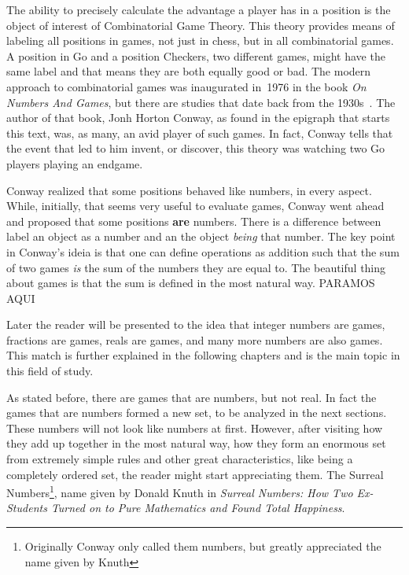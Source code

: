 The ability to precisely calculate the advantage a player has in a
position is the object of interest of Combinatorial Game Theory.
This theory provides means of labeling all positions in games, not
just in chess, but in all combinatorial games.
A position in Go and a position Checkers, two different games,
might have the same label and that means they are both equally
good or bad. The modern approach to combinatorial games
was inaugurated in~1976 in the book
\textit{On Numbers And Games}\cite{ONAG1}, but there are studies that date
back from the 1930s~\cite{CGT}.
The author of that book, Jonh Horton Conway, as
found in the epigraph that starts this text, was, as many, an avid
player of such games.
In fact, Conway tells that the event that led to
him invent, or discover, this theory was watching two Go players
playing an endgame.

Conway realized that some positions
behaved like numbers, in every aspect.
While, initially, that seems very useful to evaluate games,
Conway went ahead and proposed that some positions \textbf{are}
numbers.
There is a  difference between label an object
as a number and an the object \textit{being} that number.
The key point in Conway's ideia is
that one can define operations as addition
such that the sum of two games
\textit{is} the sum of the numbers they are equal to.
The beautiful thing about games is that the sum is defined
in the most natural way.
PARAMOS AQUI

Later the reader will be presented to the  idea that
integer numbers are games, fractions are games, reals are games,
and many more numbers are also games.
This match is further explained in the
following chapters and is the main topic in this
field of study.

As stated before, there are games that are numbers, but not real. In fact the games that are numbers formed a new set, to be analyzed in the next sections. These numbers will not look like numbers at first. However, after visiting how they add up together in the most natural way, how they form an enormous set from extremely simple rules and other great characteristics, like being a completely ordered set, the reader might start appreciating them. The Surreal Numbers\footnote{Originally Conway only called them numbers, but greatly appreciated the name given by Knuth}, name given by Donald Knuth in \textit{Surreal Numbers: How Two Ex-Students Turned on to Pure Mathematics and Found Total Happiness}\cite{SN}.

